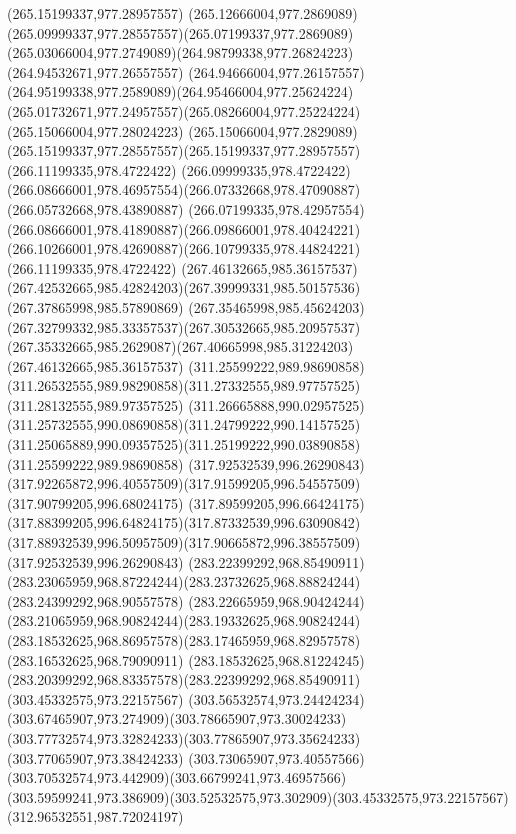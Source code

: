 {{		\moveto(265.15199337,977.28957557)
		\curveto(265.12666004,977.2869089)(265.09999337,977.28557557)(265.07199337,977.2869089)
		\curveto(265.03066004,977.2749089)(264.98799338,977.26824223)(264.94532671,977.26557557)
		\curveto(264.94666004,977.26157557)(264.95199338,977.2589089)(264.95466004,977.25624224)
		\curveto(265.01732671,977.24957557)(265.08266004,977.25224224)(265.15066004,977.28024223)
		\curveto(265.15066004,977.2829089)(265.15199337,977.28557557)(265.15199337,977.28957557)
		\moveto(266.11199335,978.4722422)
		\curveto(266.09999335,978.4722422)(266.08666001,978.46957554)(266.07332668,978.47090887)
		\lineto(266.05732668,978.43890887)
		\curveto(266.07199335,978.42957554)(266.08666001,978.41890887)(266.09866001,978.40424221)
		\curveto(266.10266001,978.42690887)(266.10799335,978.44824221)(266.11199335,978.4722422)
		\moveto(267.46132665,985.36157537)
		\curveto(267.42532665,985.42824203)(267.39999331,985.50157536)(267.37865998,985.57890869)
		\curveto(267.35465998,985.45624203)(267.32799332,985.33357537)(267.30532665,985.20957537)
		\curveto(267.35332665,985.2629087)(267.40665998,985.31224203)(267.46132665,985.36157537)
		\moveto(311.25599222,989.98690858)
		\curveto(311.26532555,989.98290858)(311.27332555,989.97757525)(311.28132555,989.97357525)
		\curveto(311.26665888,990.02957525)(311.25732555,990.08690858)(311.24799222,990.14157525)
		\curveto(311.25065889,990.09357525)(311.25199222,990.03890858)(311.25599222,989.98690858)
		\moveto(317.92532539,996.26290843)
		\curveto(317.92265872,996.40557509)(317.91599205,996.54557509)(317.90799205,996.68024175)
		\curveto(317.89599205,996.66424175)(317.88399205,996.64824175)(317.87332539,996.63090842)
		\curveto(317.88932539,996.50957509)(317.90665872,996.38557509)(317.92532539,996.26290843)
		\moveto(283.22399292,968.85490911)
		\curveto(283.23065959,968.87224244)(283.23732625,968.88824244)(283.24399292,968.90557578)
		\curveto(283.22665959,968.90424244)(283.21065959,968.90824244)(283.19332625,968.90824244)
		\curveto(283.18532625,968.86957578)(283.17465959,968.82957578)(283.16532625,968.79090911)
		\curveto(283.18532625,968.81224245)(283.20399292,968.83357578)(283.22399292,968.85490911)
		\moveto(303.45332575,973.22157567)
		\curveto(303.56532574,973.24424234)(303.67465907,973.274909)(303.78665907,973.30024233)
		\curveto(303.77732574,973.32824233)(303.77865907,973.35624233)(303.77065907,973.38424233)
		\curveto(303.73065907,973.40557566)(303.70532574,973.442909)(303.66799241,973.46957566)
		\curveto(303.59599241,973.386909)(303.52532575,973.302909)(303.45332575,973.22157567)
		\moveto(312.96532551,987.72024197)
}}

